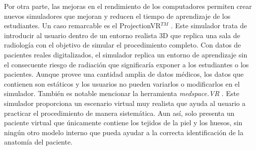 Por otra parte, las mejoras en el rendimiento de los computadores permiten crear nuevos simuladores que mejoran y reducen el tiempo de aprendizaje de los estudiantes. Un caso remarcable es el  ProjectionVR$^{TM}$ \cite{shanahan2016student}. Este simulador trata de introducir al usuario dentro de un entorno realista 3D que replica una sala de radiología con el objetivo de simular el procedimiento completo. Con datos de pacientes reales digitalizados, el simulador replica un entorno de aprendizaje sin el consecuente riesgo de radiación que significaría exponer a los estudiantes o los pacientes. Aunque provee una cantidad amplia de datos médicos, los datos que contienen son estáticos y los usuarios no pueden variarlos o modificarlos en el simulador. También es notable mencionar la herramienta \emph{medspace.VR} \cite{medspace}. Este simulador proporciona un escenario virtual muy realista que ayuda al usuario a practicar el procedimiento de manera sistemática. Aun así, solo presenta un paciente virtual que únicamente contiene los tejidos de la piel y los huesos, sin ningún otro modelo interno que pueda ayudar a la correcta identificación de la anatomía del paciente.










